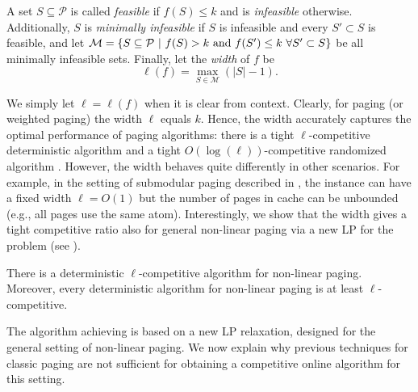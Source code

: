 \documentclass[11pt]{article}
\newcommand{\cP}{{\mathcal{P}}}
\begin{document}
\begin{definition}
	\label{def:Mininfeasible}
	A set $S \subseteq \cP$ is called {\em feasible} if $f(S) \leq k$ and is {\em infeasible} otherwise. Additionally, $S$ is {\em minimally  infeasible} if $S$ is infeasible and every $S' \subset S$ is feasible, and let $\mathcal{M} = \left\{S \subseteq \cP~|~f(S)>k \textnormal{ and } f(S') \leq k~\forall S' \subset S \right\}$ be all minimally infeasible sets. Finally, let the {\em width} of $f$ be $$\ell(f) = \max_{S \in \mathcal{M}} \left(|S|-1\right).$$ %
\end{definition}
We simply let $\ell = \ell(f)$ when it is clear from context. 
Clearly, for paging (or weighted paging) the width $\ell$ equals $k$. Hence, the width accurately captures the optimal performance of paging algorithms: there is a tight $\ell$-competitive deterministic algorithm \cite{sleator1985amortized} and a tight $O(\log(\ell))$-competitive randomized algorithm \cite{fiat1991competitive}. However, the width behaves quite differently in other scenarios. For example, in the setting of submodular paging described in , the instance can have a fixed width $\ell = O(1)$ but the number of pages in cache can be unbounded (e.g., all pages use the same atom). Interestingly, we show that the width gives a tight competitive ratio also for general non-linear paging via a new LP for the problem (see ).   %


\begin{theorem}
	\label{thm:deterministic}
	There is a deterministic $\ell$-competitive algorithm for \textnormal{non-linear paging}. Moreover, every deterministic algorithm for  \textnormal{non-linear paging} is at least $\ell$-competitive. 
\end{theorem}

The algorithm achieving  is based on a new LP relaxation, designed for the general setting of non-linear paging. We now explain why previous techniques for classic paging are not sufficient for obtaining a competitive online algorithm for this setting.
\end{document}
